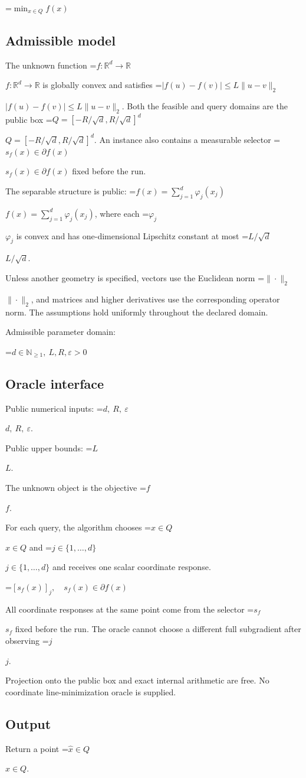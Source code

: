 \documentclass[10pt,a4paper]{article}
\newcommand{\AtlasMath}[1]{\par\begingroup\centering\setbox0=\hbox{$\displaystyle #1$}\ifdim\wd0>1.4\linewidth\typeout{ATLAS WIDE FORMULA: \the\wd0}\fi\ifdim\wd0>\linewidth\resizebox{\linewidth}{!}{\box0}\else\box0\fi\par\endgroup}
\newcommand{\AtlasInlineMath}[1]{\begingroup\setbox0=\hbox{$#1$}\ifdim\wd0>.4\linewidth\endgroup\AtlasMath{#1}\else\endgroup$#1$\fi}
\begin{document}
\AtlasMath{\min_{x\in Q}f(x)}


\subsection{Admissible model}
The unknown function \AtlasInlineMath{f:\mathbb R^d\to\mathbb R} is globally convex and satisfies \AtlasInlineMath{|f(u)-f(v)|\le L\|u-v\|_2}. Both the feasible and query domains are the public box \AtlasInlineMath{Q=[-R/\sqrt d,R/\sqrt d]^d}. An instance also contains a measurable selector \AtlasInlineMath{s_f(x)\in\partial f(x)} fixed before the run.

The separable structure is public: \AtlasInlineMath{f(x)=\sum_{j=1}^d\varphi_j(x_j)}, where each \AtlasInlineMath{\varphi_j} is convex and has one-dimensional Lipschitz constant at most \AtlasInlineMath{L/\sqrt d}.

Unless another geometry is specified, vectors use the Euclidean norm \AtlasInlineMath{\|\cdot\|_2}, and matrices and higher derivatives use the corresponding operator norm. The assumptions hold uniformly throughout the declared domain.

Admissible parameter domain:


\AtlasMath{d\in\mathbb{N}_{\ge1},\ L,R,\varepsilon>0}


\subsection{Oracle interface}
Public numerical inputs: \AtlasInlineMath{d,\ R,\ \varepsilon}.

Public upper bounds: \AtlasInlineMath{L}.

The unknown object is the objective \AtlasInlineMath{f}.

For each query, the algorithm chooses \AtlasInlineMath{x\in Q} and \AtlasInlineMath{j\in\{1,\ldots,d\}} and receives one scalar coordinate response.


\AtlasMath{[s_f(x)]_j,\quad s_f(x)\in\partial f(x)}


All coordinate responses at the same point come from the selector \AtlasInlineMath{s_f} fixed before the run. The oracle cannot choose a different full subgradient after observing \AtlasInlineMath{j}.

Projection onto the public box and exact internal arithmetic are free. No coordinate line-minimization oracle is supplied.

\subsection{Output}
Return a point \AtlasInlineMath{\widehat x\in Q}.
\end{document}

